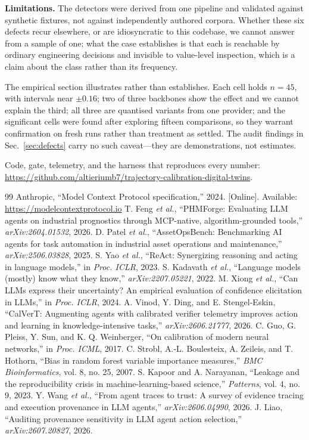 \documentclass[conference]{IEEEtran}
\begin{document}
\textbf{Limitations.} The detectors were derived from one pipeline and validated
against synthetic fixtures, not against independently authored corpora. Whether
these six defects recur elsewhere, or are idiosyncratic to this codebase, we
cannot answer from a sample of one; what the case establishes is that each is
reachable by ordinary engineering decisions and invisible to value-level
inspection, which is a claim about the class rather than its frequency.

The empirical section illustrates rather than establishes.
Each cell holds $n=45$, with intervals near $\pm0.16$; two of three backbones
show the effect and we cannot explain the third; all three are quantised
variants from one provider; and the significant cells were found after exploring
fifteen comparisons, so they warrant confirmation on fresh runs rather than
treatment as settled. The audit findings in Sec.~\ref{sec:defects} carry no such
caveat---they are demonstrations, not estimates.

Code, gate, telemetry, and the harness that reproduces every number:
\url{https://github.com/altieriumb7/trajectory-calibration-digital-twins}.

\begin{thebibliography}{99}
 Anthropic, ``Model Context Protocol specification,'' 2024.
[Online]. Available: \url{https://modelcontextprotocol.io}
 T. Feng \emph{et al.}, ``PHMForge: Evaluating LLM agents on
industrial prognostics through MCP-native, algorithm-grounded tools,''
\emph{arXiv:2604.01532}, 2026.
 D. Patel \emph{et al.}, ``AssetOpsBench: Benchmarking AI
agents for task automation in industrial asset operations and maintenance,''
\emph{arXiv:2506.03828}, 2025.
 S. Yao \emph{et al.}, ``ReAct: Synergizing reasoning and acting
in language models,'' in \emph{Proc. ICLR}, 2023.
 S. Kadavath \emph{et al.}, ``Language models (mostly) know
what they know,'' \emph{arXiv:2207.05221}, 2022.
 M. Xiong \emph{et al.}, ``Can LLMs express their uncertainty? An
empirical evaluation of confidence elicitation in LLMs,'' in \emph{Proc. ICLR},
2024.
 A. Vinod, Y. Ding, and E. Stengel-Eskin, ``CalVerT:
Augmenting agents with calibrated verifier telemetry improves action and
learning in knowledge-intensive tasks,'' \emph{arXiv:2606.21777}, 2026.
 C. Guo, G. Pleiss, Y. Sun, and K. Q. Weinberger, ``On calibration
of modern neural networks,'' in \emph{Proc. ICML}, 2017.
 C. Strobl, A.-L. Boulesteix, A. Zeileis, and T. Hothorn,
``Bias in random forest variable importance measures,'' \emph{BMC
Bioinformatics}, vol. 8, no. 25, 2007.
 S. Kapoor and A. Narayanan, ``Leakage and the reproducibility
crisis in machine-learning-based science,'' \emph{Patterns}, vol. 4, no. 9,
2023.
 Y. Wang \emph{et al.}, ``From agent traces to trust: A
survey of evidence tracing and execution provenance in LLM agents,''
\emph{arXiv:2606.04990}, 2026.
 J. Liao, ``Auditing provenance sensitivity in LLM agent
action selection,'' \emph{arXiv:2607.20827}, 2026.
\end{thebibliography}
\end{document}

